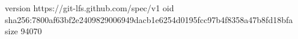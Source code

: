 version https://git-lfs.github.com/spec/v1
oid sha256:7800af63bf2e2409829006949dacb1e6254d0195fcc97b4f8358a47b8fd18bfa
size 94070

